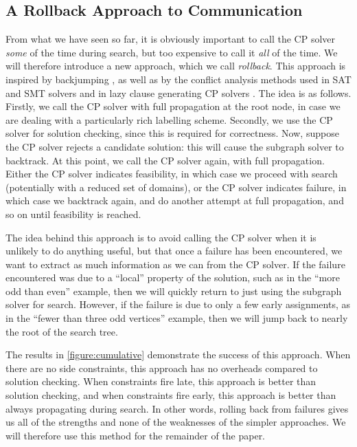 \documentclass[runningheads]{llncs}
\begin{document}
\subsection{A Rollback Approach to Communication}

From what we have seen so far, it is obviously important to call the CP solver \emph{some} of the
time during search, but too expensive to call it \emph{all} of the time. We will therefore introduce
a new approach, which we call \emph{rollback}. This approach is inspired by backjumping
\cite{DBLP:journals/ci/Prosser93}, as well as by the conflict analysis methods used in SAT and SMT
solvers \cite{DBLP:conf/iccad/SilvaS96} and in lazy clause generating CP solvers
\cite{DBLP:conf/cp/OhrimenkoSC07,DBLP:conf/cpaior/Stuckey10}. The idea is as follows.  Firstly, we
call the CP solver with full propagation at the root node, in case we are dealing with a
particularly rich labelling scheme.  Secondly, we use the CP solver for solution checking, since
this is required for correctness. Now, suppose the CP solver rejects a candidate solution: this will
cause the subgraph solver to backtrack. At this point, we call the CP solver again, with full
propagation. Either the CP solver indicates feasibility, in which case we proceed with search
(potentially with a reduced set of domains), or the CP solver indicates failure, in which case we
backtrack again, and do another attempt at full propagation, and so on until feasibility is reached.

The idea behind this approach is to avoid calling the CP solver when it is unlikely to do anything
useful, but that once a failure has been encountered, we want to extract as much information as we
can from the CP solver. If the failure encountered was due to a ``local'' property of the solution,
such as in the ``more odd than even'' example, then we will quickly return to just using the
subgraph solver for search. However, if the failure is due to only a few early assignments, as in
the ``fewer than three odd vertices'' example, then we will jump back to nearly the root of the
search tree.

The results in \cref{figure:cumulative} demonstrate the success of this approach. When there are no
side constraints, this approach has no overheads compared to solution checking. When constraints
fire late, this approach is better than solution checking, and when constraints fire early, this
approach is better than always propagating during search. In other words, rolling back from failures
gives us all of the strengths and none of the weaknesses of the simpler approaches. We will
therefore use this method for the remainder of the paper.
\end{document}
